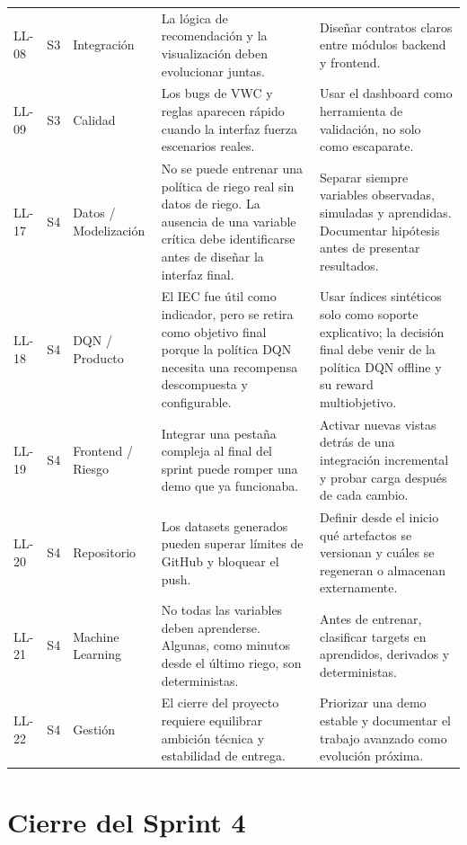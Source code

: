 \documentclass[11pt,a4paper]{article}
\begin{document}
\begin{longtable}{p{}p{}p{}p{}p{}}
LL-08 & S3 & Integración & La lógica de recomendación y la visualización deben evolucionar juntas. & Diseñar contratos claros entre módulos backend y frontend. \\
\addlinespace
LL-09 & S3 & Calidad & Los bugs de VWC y reglas aparecen rápido cuando la interfaz fuerza escenarios reales. & Usar el dashboard como herramienta de validación, no solo como escaparate. \\
\addlinespace
LL-17 & S4 & Datos / Modelización & No se puede entrenar una política de riego real sin datos de riego. La ausencia de una variable crítica debe identificarse antes de diseñar la interfaz final. & Separar siempre variables observadas, simuladas y aprendidas. Documentar hipótesis antes de presentar resultados. \\
\addlinespace
LL-18 & S4 & DQN / Producto & El IEC fue útil como indicador, pero se retira como objetivo final porque la política DQN necesita una recompensa descompuesta y configurable. & Usar índices sintéticos solo como soporte explicativo; la decisión final debe venir de la política DQN offline y su reward multiobjetivo. \\
\addlinespace
LL-19 & S4 & Frontend / Riesgo & Integrar una pestaña compleja al final del sprint puede romper una demo que ya funcionaba. & Activar nuevas vistas detrás de una integración incremental y probar carga después de cada cambio. \\
\addlinespace
LL-20 & S4 & Repositorio & Los datasets generados pueden superar límites de GitHub y bloquear el push. & Definir desde el inicio qué artefactos se versionan y cuáles se regeneran o almacenan externamente. \\
\addlinespace
LL-21 & S4 & Machine Learning & No todas las variables deben aprenderse. Algunas, como minutos desde el último riego, son deterministas. & Antes de entrenar, clasificar targets en aprendidos, derivados y deterministas. \\
\addlinespace
LL-22 & S4 & Gestión & El cierre del proyecto requiere equilibrar ambición técnica y estabilidad de entrega. & Priorizar una demo estable y documentar el trabajo avanzado como evolución próxima. \\
\bottomrule
\end{longtable}

\newpage

\section{Cierre del Sprint 4}
\end{document}
